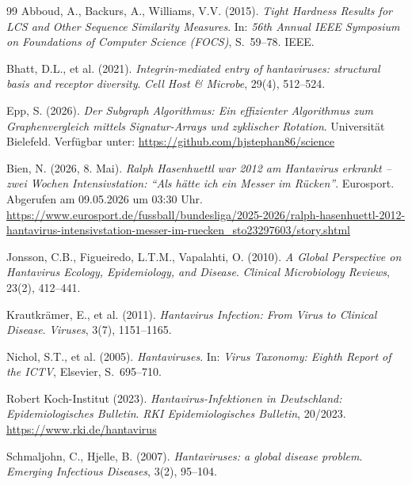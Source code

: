 ﻿\documentclass[a4paper,12pt]{article}
\theoremstyle{definition}
\begin{document}
\begin{thebibliography}{99}
    Abboud, A., Backurs, A., Williams, V.V. (2015).
    \emph{Tight Hardness Results for LCS and Other Sequence Similarity Measures}.
    In: \textit{56th Annual IEEE Symposium on Foundations of Computer Science (FOCS)},
    S.~59--78. IEEE. 

    Bhatt, D.L., et al. (2021).
    \emph{Integrin-mediated entry of hantaviruses: structural basis and receptor diversity}.
    \textit{Cell Host \& Microbe}, 29(4), 512--524.

    Epp, S. (2026).
    \emph{Der Subgraph Algorithmus: Ein effizienter Algorithmus zum Graphenvergleich
    mittels Signatur-Arrays und zyklischer Rotation}.
    Universit\"at Bielefeld. Verf\"ugbar unter: \url{https://github.com/hjstephan86/science}

    Bien, N. (2026, 8. Mai).
    \emph{Ralph Hasenhuettl war 2012 am Hantavirus erkrankt -- zwei Wochen
    Intensivstation: ``Als h\"atte ich ein Messer im R\"ucken''}.
    Eurosport. Abgerufen am 09.05.2026 um 03:30 Uhr.
    \url{https://www.eurosport.de/fussball/bundesliga/2025-2026/ralph-hasenhuettl-2012-hantavirus-intensivstation-messer-im-ruecken_sto23297603/story.shtml}

    Jonsson, C.B., Figueiredo, L.T.M., Vapalahti, O. (2010).
    \emph{A Global Perspective on Hantavirus Ecology, Epidemiology, and Disease}.
    \textit{Clinical Microbiology Reviews}, 23(2), 412--441.

    Krautkr\"amer, E., et al. (2011).
    \emph{Hantavirus Infection: From Virus to Clinical Disease}.
    \textit{Viruses}, 3(7), 1151--1165.

    Nichol, S.T., et al. (2005).
    \emph{Hantaviruses}.
    In: \textit{Virus Taxonomy: Eighth Report of the ICTV}, Elsevier,
    S.~695--710.

    Robert Koch-Institut (2023).
    \emph{Hantavirus-Infektionen in Deutschland: Epidemiologisches Bulletin}.
    \textit{RKI Epidemiologisches Bulletin}, 20/2023.
    \url{https://www.rki.de/hantavirus}

    Schmaljohn, C., Hjelle, B. (2007).
    \emph{Hantaviruses: a global disease problem}.
    \textit{Emerging Infectious Diseases}, 3(2), 95--104.


\end{thebibliography}
\end{document}
